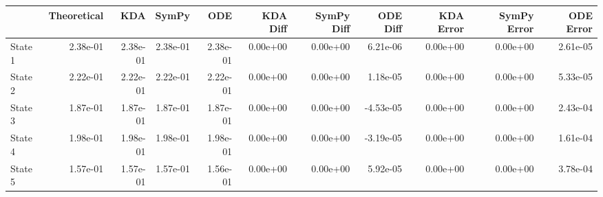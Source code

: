 \begin{tabular}{lrrrrrrrrrr}
\toprule
{} &  Theoretical &      KDA &    SymPy &      ODE &  KDA Diff &  SymPy Diff &  ODE Diff &  KDA Error &  SymPy Error &  ODE Error \\
\midrule
State 1 &     2.38e-01 & 2.38e-01 & 2.38e-01 & 2.38e-01 &  0.00e+00 &    0.00e+00 &  6.21e-06 &   0.00e+00 &     0.00e+00 &   2.61e-05 \\
State 2 &     2.22e-01 & 2.22e-01 & 2.22e-01 & 2.22e-01 &  0.00e+00 &    0.00e+00 &  1.18e-05 &   0.00e+00 &     0.00e+00 &   5.33e-05 \\
State 3 &     1.87e-01 & 1.87e-01 & 1.87e-01 & 1.87e-01 &  0.00e+00 &    0.00e+00 & -4.53e-05 &   0.00e+00 &     0.00e+00 &   2.43e-04 \\
State 4 &     1.98e-01 & 1.98e-01 & 1.98e-01 & 1.98e-01 &  0.00e+00 &    0.00e+00 & -3.19e-05 &   0.00e+00 &     0.00e+00 &   1.61e-04 \\
State 5 &     1.57e-01 & 1.57e-01 & 1.57e-01 & 1.56e-01 &  0.00e+00 &    0.00e+00 &  5.92e-05 &   0.00e+00 &     0.00e+00 &   3.78e-04 \\
\bottomrule
\end{tabular}
